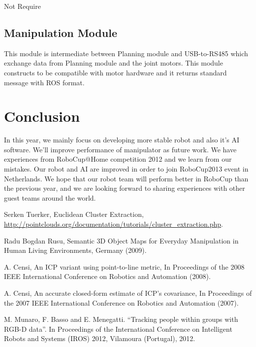 \documentclass{llncs}
\begin{document}
Not Require

\subsection{Manipulation Module}

This module is intermediate between Planning module and USB-to-RS485 which exchange data from Planning module and the joint motors. This module constructs to be compatible with motor hardware and it returns standard message with ROS format.

\section{Conclusion}

In this year, we mainly focus on developing more stable robot and also it's AI software. We'll improve performance of manipulator as future work. We have experiences from RoboCup@Home competition 2012 and we learn from our mistakes. Our robot and AI are improved in order to join RoboCup2013 event in Netherlands. We hope that our robot team will perform better in RoboCup than the previous year, and we are looking forward to sharing experiences with other guest teams around the world.

\begin{thebibliography}{4}

 Serken Tuerker, Euclidean Cluster Extraction,\\
\url{http://pointclouds.org/documentation/tutorials/cluster_extraction.php}.

 Radu Bogdan Rusu, 
Semantic 3D Object Maps for Everyday Manipulation in Human Living Environments, Germany (2009).

 A. Censi, An ICP variant using point-to-line metric, In Proceedings of the 2008 IEEE International Conference on Robotics and Automation (2008).

 A. Censi, An accurate closed-form estimate of ICP's covariance, In Proceedings of the 2007 IEEE International Conference on Robotics and Automation (2007).

 M. Munaro, F. Basso and E. Menegatti. “Tracking people within groups with RGB-D data”. In Proceedings of the International Conference on Intelligent Robots and Systems (IROS) 2012, Vilamoura (Portugal), 2012.

\end{thebibliography}
\end{document}
